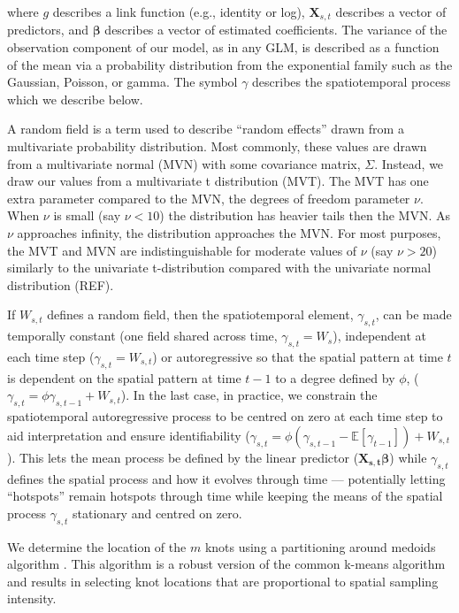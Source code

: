 \documentclass[12pt,english]{article}
\begin{document}
\begin{spacing}{1.25}
\noindent where $g$ describes a link function (e.g., identity or log),
$\bm{X}_{s,t}$ describes a vector of predictors, and $\bm{\beta}$ describes a
vector of estimated coefficients. The variance of the observation component of
our model, as in any GLM, is described as a function of the mean via a
probability distribution from the exponential family such as the Gaussian,
Poisson, or gamma. The symbol $\gamma$ describes the spatiotemporal process
which we describe below. 

A random field is a term used to describe ``random effects'' drawn from a
multivariate probability distribution. Most commonly, these values are drawn
from a multivariate normal (MVN) with some covariance matrix, $\Sigma$.
Instead, we draw our values from a multivariate t distribution (MVT). The MVT
has one extra parameter compared to the MVN, the degrees of freedom parameter
$\nu$. When $\nu$ is small (say $\nu < 10$) the distribution has heavier
tails then the MVN. As $\nu$ approaches infinity, the distribution approaches
the MVN. For most purposes, the MVT and MVN are indistinguishable for moderate
values of $\nu$ (say $\nu > 20$) similarly to the univariate t-distribution
compared with the univariate normal distribution (REF). 

If $W_{s,t}$ defines a random field, then the spatiotemporal element,
$\gamma_{s,t}$, can be made temporally constant (one field shared across time,
$\gamma_{s,t} = W_{s}$), independent at each time step ($\gamma_{s,t} =
W_{s,t}$) or autoregressive so that the spatial pattern at time $t$ is
dependent on the spatial pattern at time $t-1$ to a degree defined by $\phi$,
($\gamma_{s,t} = \phi \gamma_{s,t-1} + W_{s,t}$). In the last case, in practice,
we constrain the spatiotemporal autoregressive process to be centred on zero at
each time step to aid interpretation and ensure identifiability ($\gamma_{s,t}
= \phi (\gamma_{s,t-1} - \mathbb{E}[\gamma_{t-1}]) + W_{s,t}$). This lets the
mean process be defined by the linear predictor ($\bm{X_{s,t}}\bm{\beta}$)
while $\gamma_{s,t}$ defines the spatial process and how it evolves through
time --- potentially letting ``hotspots'' remain hotspots through time while
keeping the means of the spatial process $\gamma_{s,t}$ stationary and centred
on zero.

We determine the location of the $m$ knots using a partitioning around medoids
algorithm \citep[the \texttt{pam} function in the R package
\textbf{cluster};][]{reynolds2006}. This algorithm is a robust version of the
common k-means algorithm and results in selecting knot locations that are
proportional to spatial sampling intensity. 


\end{spacing}
\end{document}
